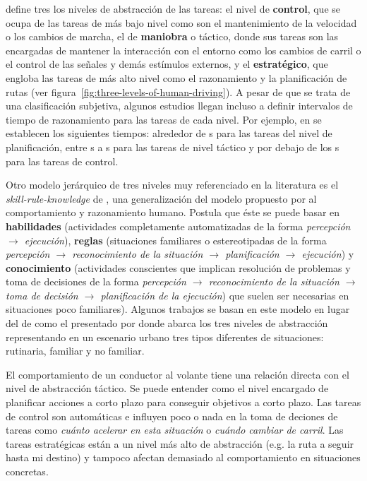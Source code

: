 \cite{michon1985critical} define tres los niveles de abstracción de las tareas: el nivel de \textbf{control}, que se ocupa de las tareas de más bajo nivel como son el mantenimiento de la velocidad o los cambios de marcha, el de \textbf{maniobra} o táctico, donde sus tareas son las encargadas de mantener la interacción con el entorno como los cambios de carril o el control de las señales y demás estímulos externos, y el \textbf{estratégico}, que engloba las tareas de más alto nivel como el razonamiento y la planificación de rutas (ver figura~\ref{fig:three-levels-of-human-driving}). A pesar de que se trata de una clasificación subjetiva, algunos estudios llegan incluso a definir intervalos de tiempo de razonamiento para las tareas de cada nivel. Por ejemplo, en \cite{Alexiadis2004} se establecen los siguientes tiempos: alrededor de \unit[30]{s} para las tareas del nivel de planificación, entre \unit[5]{s} a \unit[30]{s} para las tareas de nivel táctico y por debajo de los \unit[5]{s} para las tareas de control.

Otro modelo jerárquico de tres niveles muy referenciado en la literatura es el \textit{skill-rule-knowledge} de \cite{Rasmussen1986}, una generalización del modelo propuesto por \cite{michon1985critical} al comportamiento y razonamiento humano. Postula que éste se puede basar en \textbf{habilidades} (actividades completamente automatizadas de la forma \textit{percepción $\rightarrow$ ejecución}), \textbf{reglas} (situaciones familiares o estereotipadas de la forma \textit{percepción $\rightarrow$ reconocimiento de la situación $\rightarrow$ planificación $\rightarrow$ ejecución}) y \textbf{conocimiento} (actividades conscientes que implican resolución de problemas y toma de decisiones de la forma \textit{percepción $\rightarrow$ reconocimiento de la situación $\rightarrow$ toma de decisión $\rightarrow$ planificación de la ejecución}) que suelen ser necesarias en situaciones poco familiares). Algunos trabajos se basan en este modelo en lugar del de \cite{michon1985critical} como el presentado por \cite{Chaib-draa1994} donde abarca los tres niveles de abstracción representando en un escenario urbano tres tipos diferentes de situaciones: rutinaria, familiar y no familiar.

El comportamiento de un conductor al volante tiene una relación directa con el nivel de abstracción táctico. Se puede entender como el nivel encargado de planificar acciones a corto plazo para conseguir objetivos a corto plazo. Las tareas de control son automáticas e influyen poco o nada en la toma de deciones de tareas como \textit{cuánto acelerar en esta situación} o \textit{cuándo cambiar de carril}. Las tareas estratégicas están a un nivel más alto de abstracción (e.g. la ruta a seguir hasta mi destino) y tampoco afectan demasiado al comportamiento en situaciones concretas.

